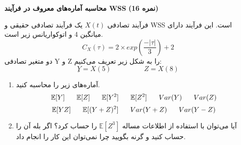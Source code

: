 \Large \textbf{محاسبه آماره‌های معروف در فرآیند WSS}
\large \textbf{(16 نمره)}

\normalsize \vspace{0.5cm}
فرآیند تصادفی
$ X(t) $
یک فرآیند تصادفی حقیقی و WSS است. این فرآیند دارای میانگین 4 و اتوکواریانس زیر است.
$$
C_X(\tau) = 2 \times exp(\frac{-|\tau|}{3}) + 2
$$
دو متغیر تصادفی Y و Z را به شکل زیر تعریف می‌کنیم:
$$
ِY = X(5)  \hspace{2cm} Z = X(8)
$$
\begin{enumerate}[label=(\alph*)]
	\item
	آماره‌های زیر را محاسبه کنید.
	$$
	\mathbb{E}[Y] 
	\hspace{0.6cm} 
	\mathbb{E}[Z] 
	\hspace{0.6cm}
	\mathbb{E}[Y^2] 
	\hspace{0.6cm} 
	\mathbb{E}[Z^2] 
	\hspace{0.6cm}
	Var(Y)
	\hspace{0.6cm} 
	Var(Z)
	$$
	$$
	\mathbb{E}[YZ] 
	\hspace{0.6cm} 
	\mathbb{E}[(Y+Z)^2] 
	\hspace{0.6cm}
	Var(Y + Z)
	\hspace{0.6cm}
	Var(Y - Z)
	$$
	\item 
	آیا می‌توان با استفاده از اطلاعات مساله
	$ \mathbb{E}[Z^3] $
	را حساب کرد؟ اگر بله آن را حساب کنید و گرنه بگویید چرا نمی‌توان این کار را انجام داد.
\end{enumerate}


